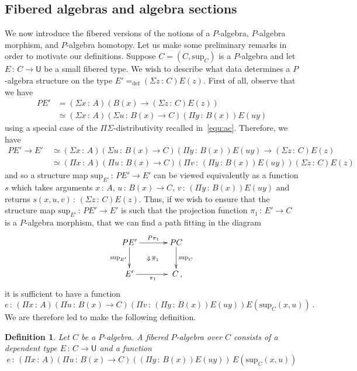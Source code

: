 \documentclass[10pt,a4paper,oneside,reqno]{amsart}
\numberwithin{equation}{section}
\theoremstyle{mythm}
\theoremstyle{mydef}
\newtheorem{definition}[theorem]{Definition}
\theoremstyle{myrmk}
\newcommand{\ie}{\text{i.e.\ }}
\newcommand{\defeq}{=_{\mathrm{def}}}
\newcommand{\co}{\,{:}\,}
\newcommand{\U}{\mathsf{U}}
\renewcommand{\sup}{\mathrm{sup}}
\begin{document}
\subsection{Fibered algebras and algebra sections} We now introduce the fibered versions of the notions of a $P$-algebra, $P$-algebra morphism, and $P$-algebra homotopy. Let us make some
preliminary remarks in order to motivate our definitions. 
Suppose $C = (C, \sup_C)$ is a $P$-algebra and let $E \co C \to \U$ be a small fibered type.
We wish to describe what data determines a $P$-algebra structure on the type $E' \defeq (\Sigma z \co C) E(z)$. First of all, observe that we have 
\begin{align*}
PE' & = (\Sigma x \co A)  (B(x) \to (\Sigma z \co C)E(z)) \\
 & \simeq (\Sigma x \co A) (\Sigma u \co B(x) \to C) (\Pi y \co B(x)) E (uy) 
\end{align*}
using a special case of the $\Pi\Sigma$-distributivity recalled in~\eqref{equ:ac}. 
Therefore, we have
\begin{align*} 
PE' \to E' \ & \simeq 
 (\Sigma x \co A) (\Sigma u \co B(x) \to C) (\Pi y \co B(x)) E (uy)  \to (\Sigma z \co C) E(z) \\ 
 & \simeq (\Pi x \co A)(\Pi u \co B(x) \to C) (\Pi v \co (\Pi y \co B(x)) E(uy)) (\Sigma z \co C) E(z) 
\end{align*}
and so a structure map $\sup_{E'} \co PE' \to E'$ can be viewed equivalently as a function $s$ which 
takes arguments $x \co A$, $u \co B(x) \to C$, $v \co (\Pi y \co B(x))E(uy)$ and returns $s(x,u,v) \co (\Sigma z \co C) E(z)$.
Thus, if we wish to ensure that the structure map $\sup_{E'} \co PE' \to E'$ is such that the projection function
 $\pi_1 \co E' \to C$ is a $P$-algebra morphism,  \ie that we can find a path fitting in the diagram
 \[
 \xymatrix@C=1.2cm{
 PE' \ar[r]^-{P \pi_1} \ar[d]_{\sup_{E'}} \ar@{}[dr]|{\Downarrow \,  \overline{\pi}_1} & PC \ar[d]^{\sup_C} \\
 E' \ar[r]_{\pi_1} & \; C \, ,}
 \]
it is sufficient to have a function
\[
e \co (\Pi x \co A)(\Pi u \co B(x) \to C) (\Pi v \co (\Pi y \co B(x)) E(uy))  E(\sup_C(x,u)) \, . 
 \]  
 We are therefore led to make the following definition. 

\begin{definition} \label{def:fibalg}
Let $C$ be a $P$-algebra. A \emph{fibered $P$-algebra} over $C$ consists of a dependent type $E \co C \to \U$
and a function 
\[
e \co  (\Pi x \co A) (\Pi u \co B(x) \to C)   ((\Pi y \co B(x))   E(u y))  \,  E(\sup_C(x,u))
 \] 
\end{definition}
\end{document}
